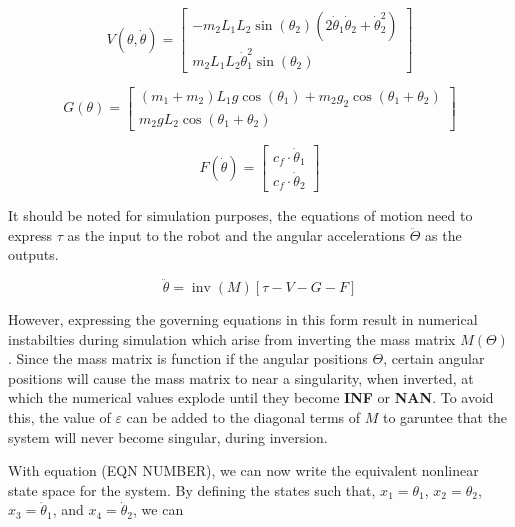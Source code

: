 \documentclass[journal]{IEEEtran}
\begin{document}
\begin{equation}
V(\theta, \dot{\theta})=\left[\begin{array}{c}
-m_{2} L_{1} L_{2} \sin \left(\theta_{2}\right)\left(2 \dot{\theta}_{1} \dot{\theta}_{2}+\dot{\theta}_{2}^{2}\right) \\
m_{2} L_{1} L_{2} \dot{\theta}_{1}^{2} \sin \left(\theta_{2}\right)
\end{array}\right]
\end{equation}


\begin{equation}
G(\theta)=\left[\begin{array}{c}
\left(m_{1}+m_{2}\right) L_{1} g \cos \left(\theta_{1}\right)+m_{2} g_{2} \cos \left(\theta_{1}+\theta_{2}\right) \\
m_{2} g L_{2} \cos \left(\theta_{1}+\theta_{2}\right)
\end{array}\right]
\end{equation}


\begin{equation}
F(\dot{\theta})=\left[\begin{array}{c}
c_{f} \cdot \dot{\theta}_{1} \\
c_{f} \cdot \dot{\theta}_{2}
\end{array}\right]
\end{equation}


It should be noted for simulation purposes, the equations of motion need to express $\tau$ as the input to the robot and the angular accelerations $\ddot{\Theta}$ as the outputs.

\begin{equation}
\ddot{\theta}=\operatorname{inv}(M)[\tau-V-G-F]
\end{equation}

However, expressing the governing equations in this form result in numerical instabilties during simulation which arise from inverting the mass matrix $M(\Theta)$. Since the mass matrix is function if the angular positions $\Theta$, certain angular positions will cause the mass matrix to near a singularity, when inverted, at which the numerical values explode until they become \textbf{INF} or \textbf{NAN}. To avoid this, the value of $\varepsilon$ can be added to the diagonal terms of $M$ to garuntee that the system will never become singular, during inversion.


With equation (EQN NUMBER), we can now write the equivalent nonlinear state space for the system. By defining the states such that, $x_{1}=\theta_{1}$, $x_{2}=\theta_{2}$, $x_{3}=\dot{\theta}_{1}$, and $x_{4}=\dot{\theta}_{2}$, we can
\end{document}
